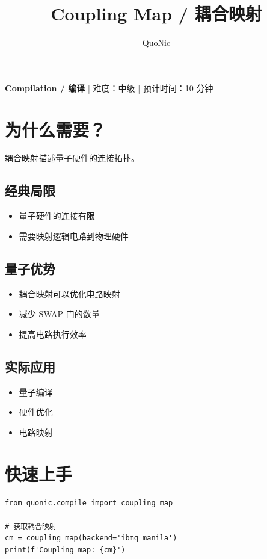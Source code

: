 \documentclass[12pt,a4paper]{article}
\title{Coupling Map / 耦合映射}
\author{QuoNic}
\date{}
\begin{document}
\maketitle

\begin{center}
\textbf{Compilation / 编译} | 难度：中级 | 预计时间：10 分钟
\end{center}

\tableofcontents
\newpage

\section{为什么需要？}

耦合映射描述量子硬件的连接拓扑。

\subsection{经典局限}
\begin{itemize}
  \item 量子硬件的连接有限
  \item 需要映射逻辑电路到物理硬件
\end{itemize}

\subsection{量子优势}
\begin{itemize}
  \item 耦合映射可以优化电路映射
  \item 减少 SWAP 门的数量
  \item 提高电路执行效率
\end{itemize}

\subsection{实际应用}
\begin{itemize}
  \item 量子编译
  \item 硬件优化
  \item 电路映射
\end{itemize}

\section{快速上手}

\begin{verbatim}
from quonic.compile import coupling_map

# 获取耦合映射
cm = coupling_map(backend='ibmq_manila')
print(f'Coupling map: {cm}')
\end{verbatim}
\end{document}

